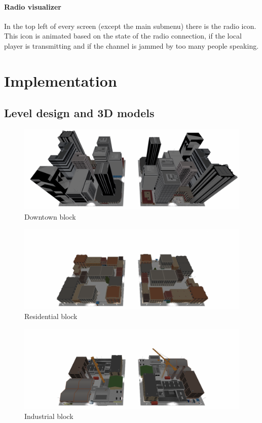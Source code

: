 \documentclass[12pt]{article}
\begin{document}
\paragraph{Radio visualizer}
In the top left of every screen (except the main submenu) there is the radio icon. This icon is animated based on the state of the radio connection, if the local player is transmitting and if the channel is jammed by too many people speaking.

\clearpage

\section{Implementation}

\subsection{Level design and 3D models}
\begin{figure}[H]
\includegraphics[width=\textwidth]{blockskyscraper}
\caption{Downtown block}
\end{figure}
\begin{figure}[H]
\includegraphics[width=\textwidth]{blockresidential}
\caption{Residential block}
\end{figure}
\begin{figure}[H]
\includegraphics[width=\textwidth]{blockcargo}
\caption{Industrial block}
\end{figure}
\end{document}
